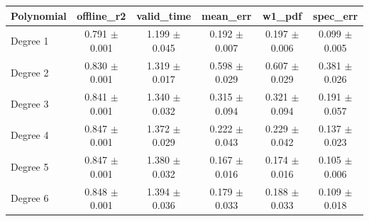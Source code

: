 \begin{tabular}{lccccc}
\toprule
Polynomial & offline\_r2 & valid\_time & mean\_err & w1\_pdf & spec\_err \\
\midrule
Degree 1 & 0.791 $\pm$ 0.001 & 1.199 $\pm$ 0.045 & 0.192 $\pm$ 0.007 & 0.197 $\pm$ 0.006 & 0.099 $\pm$ 0.005 \\
Degree 2 & 0.830 $\pm$ 0.001 & 1.319 $\pm$ 0.017 & 0.598 $\pm$ 0.029 & 0.607 $\pm$ 0.029 & 0.381 $\pm$ 0.026 \\
Degree 3 & 0.841 $\pm$ 0.001 & 1.340 $\pm$ 0.032 & 0.315 $\pm$ 0.094 & 0.321 $\pm$ 0.094 & 0.191 $\pm$ 0.057 \\
Degree 4 & 0.847 $\pm$ 0.001 & 1.372 $\pm$ 0.029 & 0.222 $\pm$ 0.043 & 0.229 $\pm$ 0.042 & 0.137 $\pm$ 0.023 \\
Degree 5 & 0.847 $\pm$ 0.001 & 1.380 $\pm$ 0.032 & 0.167 $\pm$ 0.016 & 0.174 $\pm$ 0.016 & 0.105 $\pm$ 0.006 \\
Degree 6 & 0.848 $\pm$ 0.001 & 1.394 $\pm$ 0.036 & 0.179 $\pm$ 0.033 & 0.188 $\pm$ 0.033 & 0.109 $\pm$ 0.018 \\
\bottomrule
\end{tabular}
